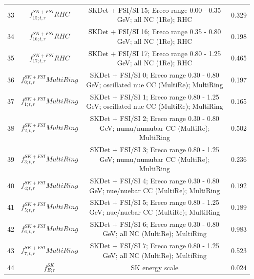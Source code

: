 \begin{tabular} { | c | c | c | c |  }
33 & $f_{15; t, r}^{SK+FSI}RHC$ & SKDet + FSI/SI 15; Ereco range 0.00 - 0.35 GeV; all NC (1Re); RHC & 0.329\\ 
34 & $f_{16; t, r}^{SK+FSI}RHC$ & SKDet + FSI/SI 16; Ereco range 0.35 - 0.80 GeV; all NC (1Re); RHC & 0.198\\ 
35 & $f_{17; t, r}^{SK+FSI}RHC$ & SKDet + FSI/SI 17; Ereco range 0.80 - 1.25 GeV; all NC (1Re); RHC & 0.465\\ 
36 & $f_{0; t, r}^{SK+FSI}MultiRing$ & SKDet + FSI/SI  0; Ereco range 0.30 - 0.80 GeV; oscillated nue CC (MultiRe); MultiRing & 0.197\\ 
37 & $f_{1; t, r}^{SK+FSI}MultiRing$ & SKDet + FSI/SI  1; Ereco range 0.80 - 1.25 GeV; oscillated nue CC (MultiRe); MultiRing & 0.165\\ 
38 & $f_{2; t, r}^{SK+FSI}MultiRing$ & SKDet + FSI/SI  2; Ereco range 0.30 - 0.80 GeV; numu/numubar CC (MultiRe); MultiRing & 0.502\\ 
39 & $f_{3; t, r}^{SK+FSI}MultiRing$ & SKDet + FSI/SI  3; Ereco range 0.80 - 1.25 GeV; numu/numubar CC (MultiRe); MultiRing & 0.236\\ 
40 & $f_{4; t, r}^{SK+FSI}MultiRing$ & SKDet + FSI/SI  4; Ereco range 0.30 - 0.80 GeV; nue/nuebar CC (MultiRe); MultiRing & 0.192\\ 
41 & $f_{5; t, r}^{SK+FSI}MultiRing$ & SKDet + FSI/SI  5; Ereco range 0.80 - 1.25 GeV; nue/nuebar CC (MultiRe); MultiRing & 0.189\\ 
42 & $f_{6; t, r}^{SK+FSI}MultiRing$ & SKDet + FSI/SI  6; Ereco range 0.30 - 0.80 GeV; all NC (MultiRe); MultiRing & 0.983\\ 
43 & $f_{7; t, r}^{SK+FSI}MultiRing$ & SKDet + FSI/SI  7; Ereco range 0.80 - 1.25 GeV; all NC (MultiRe); MultiRing & 0.523\\ 
44 & $f_{E; r}^{SK}$ & SK energy scale & 0.024\\ 

\hline

\end{tabular}